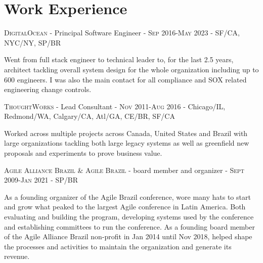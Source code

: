 \documentclass[letter,10pt]{article}
\begin{document}
\section{Work Experience}

\textsc{DigitalOcean} - Principal Software Engineer - \textsc{Sep 2016}-\textsc{May 2023} - SF/CA, NYC/NY, SP/BR

Went from full stack engineer to technical leader to, for the last 2.5 years, architect tackling overall system design for the whole organization including up to 600 engineers. I was also the main contact for all compliance and SOX related engineering change controls.

\textsc{ThoughtWorks} - Lead Consultant - \textsc{Nov 2011}-\textsc{Aug 2016} - Chicago/IL, Redmond/WA, Calgary/CA, Atl/GA, CE/BR, SF/CA

Worked across multiple projects across Canada, United States and Brazil with large organizations tackling both large legacy systems as well as greenfield new proposals and experiments to prove business value.

\textsc{Agile Alliance Brazil \& Agile Brazil} - board member and organizer - \textsc{Sept 2009}-\textsc{Jan 2021} - SP/BR

As a founding organizer of the Agile Brazil conference, wore many hats to start and grow what peaked to the largest Agile conference in Latin America. Both evaluating and building the program, developing systems used by the conference and establishing committees to run the conference.
As a founding board member of the Agile Alliance Brazil non-profit in Jan 2014 until Nov 2018, helped shape the processes and activities to maintain the organization and generate its revenue.
\end{document}
